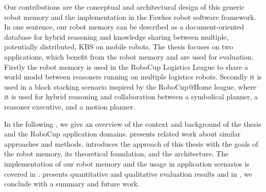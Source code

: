 Our contributions are the conceptual and architectural design of this
generic robot memory and the implementation in the Fawkes robot
software framework. In one sentence, our robot memory can be described
as a document-oriented database for hybrid reasoning and knowledge
sharing between multiple, potentially distributed, KBS on mobile robots. The thesis focuses on
two applications, which benefit from the robot memory and are used for
evaluation. Firstly the robot memory is used in the RoboCup
Logistics League to share a world model between reasoners running on
multiple logistics robots. Secondly it is used in a block stacking
scenario inspired by the RoboCup@Home league, where it is used for
hybrid reasoning and collaboration between a symbolical
planner, a reasoner executive, and a motion planner.

In the following , we give an overview of the
context and background of the thesis and the RoboCup application
domains.  presents related work about similar
approaches and methods.   introduces the
approach of this thesis with the goals of the robot memory, its
theoretical foundation, and the architecture. The implementation of
our robot memory and the usage in application scenarios is covered in
.  presents quantitative and
qualitative evaluation results and in , we
conclude with a summary and future work.
